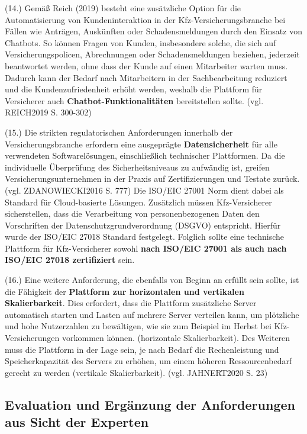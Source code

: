 (14.) Gemäß Reich (2019) besteht eine zusätzliche Option für die Automatisierung von Kundeninteraktion in der Kfz-Versicherungsbranche bei Fällen wie Anträgen, Auskünften oder Schadensmeldungen durch den Einsatz von Chatbots. So können Fragen von Kunden, insbesondere solche, die sich auf Versicherungspolicen, Abrechnungen oder Schadensmeldungen beziehen, jederzeit beantwortet werden, ohne dass der Kunde auf einen Mitarbeiter warten muss. Dadurch kann der Bedarf nach Mitarbeitern in der Sachbearbeitung reduziert und die Kundenzufriedenheit erhöht werden, weshalb die Plattform für Versicherer auch \textbf{Chatbot-Funktionalitäten} bereitstellen sollte. (vgl. REICH2019 S. 300-302)

(15.) Die strikten regulatorischen Anforderungen innerhalb der Versicherungsbranche erfordern eine ausgeprägte \textbf{Datensicherheit} für alle verwendeten Softwarelösungen, einschließlich technischer Plattformen. Da die individuelle Überprüfung des Sicherheitsniveaus zu aufwändig ist, greifen Versicherungsunternehmen in der Praxis auf Zertifizierungen und Testate zurück. (vgl. ZDANOWIECKI2016 S. 777) Die ISO/EIC 27001 Norm dient dabei als Standard für Cloud-basierte Lösungen. Zusätzlich müssen Kfz-Versicherer sicherstellen, dass die Verarbeitung von personenbezogenen Daten den Vorschriften der Datenschutzgrundverordnung (DSGVO) entspricht. Hierfür wurde der ISO/EIC 27018 Standard festgelegt. Folglich sollte eine technische Plattform für Kfz-Versicherer sowohl \textbf{nach ISO/EIC 27001 als auch nach ISO/EIC 27018 zertifiziert} sein. 

(16.) Eine weitere Anforderung, die ebenfalls von Beginn an erfüllt sein sollte, ist die Fähigkeit der \textbf{Plattform zur horizontalen und vertikalen Skalierbarkeit}. Dies erfordert, dass die Plattform zusätzliche Server automatisch starten und Lasten auf mehrere Server verteilen kann, um plötzliche und hohe Nutzerzahlen zu bewältigen, wie sie zum Beispiel im Herbst bei Kfz-Versicherungen vorkommen können. (horizontale Skalierbarkeit). Des Weiteren muss die Plattform in der Lage sein, je nach Bedarf die Rechenleistung und Speicherkapazität des Servers zu erhöhen, um einem höheren Ressourcenbedarf gerecht zu werden (vertikale Skalierbarkeit). (vgl. JAHNERT2020 S. 23)

\subsection{Evaluation und Ergänzung der Anforderungen aus Sicht der Experten}

